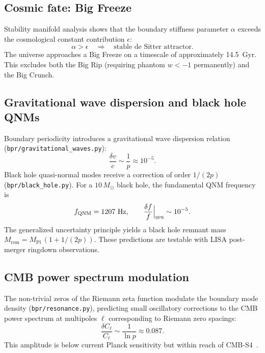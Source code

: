 \documentclass[aps,prd,twocolumn,superscriptaddress,longbibliography,nofootinbib]{revtex4-2}
\newcommand{\MPl}{M_{\mathrm{Pl}}}
\newcommand{\bpr}{\textsc{bpr}}
\begin{document}
\subsection{Cosmic fate: Big Freeze}

Stability manifold analysis shows that the boundary stiffness
parameter $\alpha$ exceeds the cosmological constant contribution
$\epsilon$:
\begin{equation}
\alpha > \epsilon \quad \Longrightarrow \quad
\text{stable de Sitter attractor}.
\label{eq:cosmic_fate}
\end{equation}
The universe approaches a Big Freeze on a timescale of approximately
14.5~Gyr.  This excludes both the Big Rip (requiring phantom
$w < -1$ permanently) and the Big Crunch.

\subsection{Gravitational wave dispersion and black hole QNMs}

Boundary periodicity introduces a gravitational wave dispersion
relation (\texttt{bpr/gravitational\_waves.py}):
\begin{equation}
\frac{\delta v}{c} \sim \frac{1}{p} \approx 10^{-5}.
\label{eq:gw_dispersion}
\end{equation}
Black hole quasi-normal modes receive a correction of order
$1/(2p)$ (\texttt{bpr/black\_hole.py}).  For a $10\,M_\odot$ black
hole, the fundamental QNM frequency is
\begin{equation}
f_{\mathrm{QNM}} = 1207~\text{Hz}, \qquad
\frac{\delta f}{f}\Big|_{\bpr} \sim 10^{-5}.
\label{eq:qnm}
\end{equation}
The generalized uncertainty principle yields a black hole remnant
mass $M_{\mathrm{rem}} = \MPl\,(1 + 1/(2p))$.  These predictions
are testable with LISA post-merger ringdown observations.

\subsection{CMB power spectrum modulation}

The non-trivial zeros of the Riemann zeta function modulate the
boundary mode density (\texttt{bpr/resonance.py}), predicting small
oscillatory corrections to the CMB power spectrum at multipoles
$\ell$ corresponding to Riemann zero spacings:
\begin{equation}
\frac{\delta C_\ell}{C_\ell} \sim \frac{1}{\ln p} \approx 0.087.
\label{eq:cmb_mod}
\end{equation}
This amplitude is below current Planck sensitivity but within reach
of CMB-S4~\cite{CMBS4}.
\end{document}
